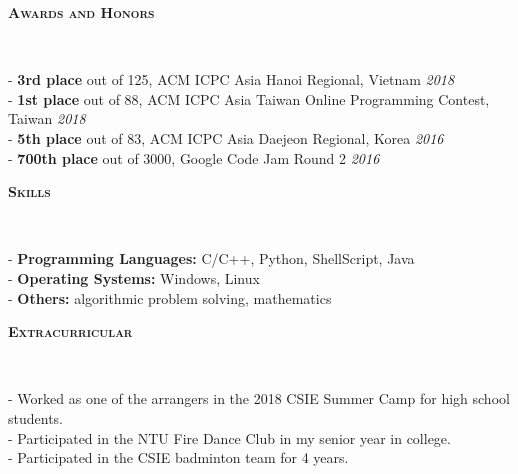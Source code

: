 \documentclass[10pt]{article}
\newenvironment{changemargin}[2]{%
  \begin{list}{}{%
    \setlength{\topsep}{0pt}%
    \setlength{\leftmargin}{#1}%
    \setlength{\rightmargin}{#2}%
    \setlength{\listparindent}{\parindent}%
    \setlength{\itemindent}{\parindent}%
    \setlength{\parsep}{\parskip}%
  }%
  \item[]}{\end{list}
}
\newcommand{\lineover}{
	\begin{changemargin}{-0.05in}{-0.05in}
		\vspace*{-8pt}
		\hrulefill \\
		\vspace*{-2pt}
	\end{changemargin}
}
\newcommand{\header}[1]{
	\begin{changemargin}{-0.5in}{-0.5in}
		\large{\bf \scshape{#1}}\\
  	\lineover
	\end{changemargin}
}
\newenvironment{body} {
	\vspace*{-16pt}
	\begin{changemargin}{-0.25in}{-0.5in}
  }	
	{\end{changemargin}
}
\begin{document}
\header{Awards and Honors}

\begin{body}

	\vspace{14pt}
        - \textbf{3rd place} out of 125, ACM ICPC Asia Hanoi Regional, Vietnam \hfill \emph{2018}\\
        - \textbf{1st place} out of 88, ACM ICPC Asia Taiwan Online Programming Contest, Taiwan \hfill \emph{2018}\\
        - \textbf{5th place} out of 83, ACM ICPC Asia Daejeon Regional, Korea \hfill \emph{2016}\\
        - \textbf{700th place} out of 3000, Google Code Jam Round 2 \hfill \emph{2016}\\
	\smallskip		   	
	
\end{body}

\smallskip

\header{Skills}

\begin{body}
	\vspace{14pt}
		- \textbf{Programming Languages:} C/C++, Python, ShellScript, Java \\
		- \textbf{Operating Systems:} Windows, Linux\\
		- \textbf{Others:} algorithmic problem solving, mathematics\\
\end{body}

\smallskip



\header{Extracurricular}

\begin{body}
    \vspace{14pt}
        - Worked as one of the arrangers in the 2018 CSIE Summer Camp for high school students.\\
		- Participated in the NTU Fire Dance Club in my senior year in college.\\
    	- Participated in the CSIE badminton team for 4 years.\\
	\smallskip
	
\end{body}
\fi
\end{document}
